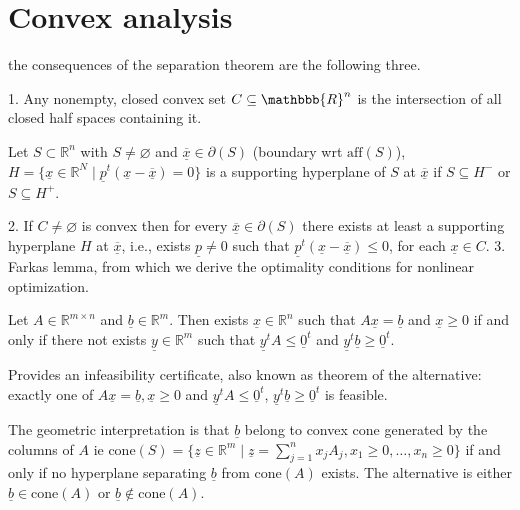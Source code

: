\section{Convex analysis}






the consequences of the separation theorem are the following three. 

1. Any nonempty, closed convex set $C\subseteq\mathbbb{R}^n$ is the intersection of all closed half spaces containing it. 
\begin{definition}
    Let $S\subset\mathbb{R}^n$ with $S\neq\varnothing$ and $\underline{\overline{x}}\in\partial(S)$ (boundary wrt $\text{aff}(S)$), $H=\{\underline{x}\in\mathbb{R}^N\mid\underline{p}^t(\underline{x}-\underline{\overline{x}})=0\}$ is a supporting hyperplane of $S$ at $\underline{\overline{x}}$ if $S\subseteq H^{-}$ or $S\subseteq H^{+}$.  
\end{definition}
2. If $C\neq\varnothing$ is convex then for every $\underline{\overline{x}}\in\partial(S)$ there exists at least a supporting hyperplane $H$ at $\underline{\overline{x}}$, i.e., exists $\underline{p}\neq 0$ such that $\underline{p}^t(\underline{x}-\underline{\overline{x}})\leq 0$, for each $\underline{x}\in C$. 
3. Farkas lemma, from which we derive the optimality conditions for nonlinear optimization. 
\begin{lemma}
    Let $A\in\mathbb{R}^{m\times n}$ and $\underline{b}\in\mathbb{R}^m$. 
    Then exists $\underline{x}\in\mathbb{R}^n$ such that $A\underline{x}=\underline{b}$ and $\underline{x}\geq 0$ if and only if there not exists $\underline{y}\in\mathbb{R}^m$ such that $\underline{y}^tA\leq\underline{0}^t$ and $\underline{y}^t\underline{b}\geq\underline{0}^t$.
\end{lemma}
Provides an infeasibility certificate, also known as theorem of the alternative: exactly one of $A\underline{x}=\underline{b},\underline{x}\geq 0$ and $\underline{y}^tA\leq\underline{0}^t$, $\underline{y}^t\underline{b}\geq\underline{0}^t$ is feasible. 

The geometric interpretation is that $\underline{b}$ belong to convex cone generated by the columns of $A$ ie $\text{cone}(S)=\{\underline{z}\in\mathbb{R}^m\mid\underline{z}=\sum_{j=1}^{n}x_jA_j,x_1\geq 0,\dots,x_n\geq 0\}$ if and only if no hyperplane separating $\underline{b}$ from $\text{cone}(A)$ exists.
The alternative is either $\underline{b}\in\text{cone}(A)$ or $\underline{b}\notin\text{cone}(A)$. 

